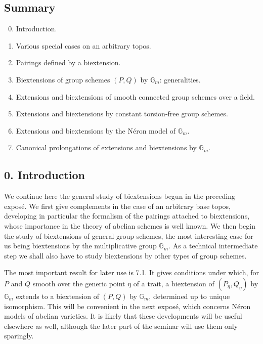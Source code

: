 \documentclass[11pt]{article}
\providecommand{\Gm}{\mathbb G_m}
\begin{document}
\subsection*{Summary}
\begin{enumerate}[label=\arabic*.]
\setcounter{enumi}{-1}
\item Introduction.
\item Various special cases on an arbitrary topos.
\item Pairings defined by a biextension.
\item Biextensions of group schemes \((P,Q)\) by \(\Gm\): generalities.
\item Extensions and biextensions of smooth connected group schemes over a field.
\item Extensions and biextensions by constant torsion-free group schemes.
\item Extensions and biextensions by the Néron model of \(\Gm\).
\item Canonical prolongations of extensions and biextensions by \(\Gm\).
\end{enumerate}

\subsection*{0. Introduction}

We continue here the general study of biextensions begun in the preceding exposé.  We first give complements in the case of an arbitrary base topos, developing in particular the formalism of the pairings attached to biextensions, whose importance in the theory of abelian schemes is well known.  We then begin the study of biextensions of general group schemes, the most interesting case for us being biextensions by the multiplicative group \(\Gm\).  As a technical intermediate step we shall also have to study biextensions by other types of group schemes.

The most important result for later use is 7.1.  It gives conditions under which, for \(P\) and \(Q\) smooth over the generic point \(\eta\) of a trait, a biextension of \((P_\eta,Q_\eta)\) by \(\Gm\) extends to a biextension of \((P,Q)\) by \(\Gm\), determined up to unique isomorphism.  This will be convenient in the next exposé, which concerns Néron models of abelian varieties.  It is likely that these developments will be useful elsewhere as well, although the later part of the seminar will use them only sparingly.
\end{document}
